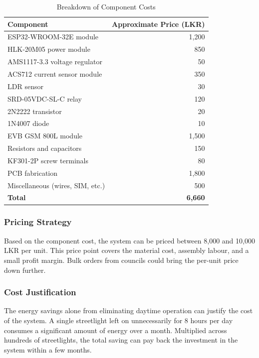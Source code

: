 \begin{table}[H]
    \centering
    \caption{Breakdown of Component Costs}
    \label{tab:cost}
    \begin{tabular}{lr}
        \toprule
        \textbf{Component} & \textbf{Approximate Price (LKR)} \\
        \midrule
        ESP32-WROOM-32E module & 1,200 \\
        HLK-20M05 power module & 850 \\
        AMS1117-3.3 voltage regulator & 50 \\
        ACS712 current sensor module & 350 \\
        LDR sensor & 30 \\
        SRD-05VDC-SL-C relay & 120 \\
        2N2222 transistor & 20 \\
        1N4007 diode & 10 \\
        EVB GSM 800L module & 1,500 \\
        Resistors and capacitors & 150 \\
        KF301-2P screw terminals & 80 \\
        PCB fabrication & 1,800 \\
        Miscellaneous (wires, SIM, etc.) & 500 \\
        \midrule
        \textbf{Total} & \textbf{6,660} \\
        \bottomrule
    \end{tabular}
\end{table}

\subsubsection{Pricing Strategy}

Based on the component cost, the system can be priced between 8,000 and 10,000 LKR per unit. This price point covers the material cost, assembly labour, and a small profit margin. Bulk orders from councils could bring the per-unit price down further.

\subsubsection{Cost Justification}

The energy savings alone from eliminating daytime operation can justify the cost of the system. A single streetlight left on unnecessarily for 8 hours per day consumes a significant amount of energy over a month. Multiplied across hundreds of streetlights, the total saving can pay back the investment in the system within a few months.

